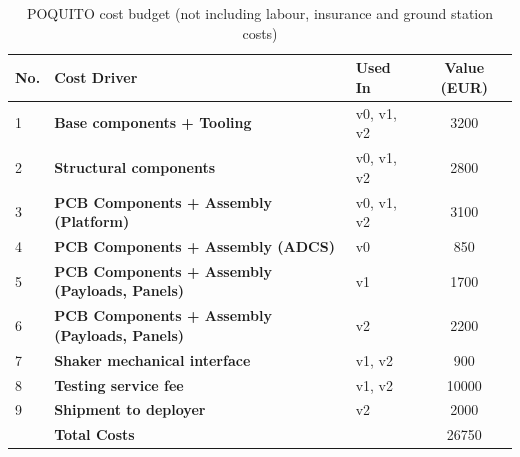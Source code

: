 \documentclass[a4paper,nobib,justified,final]{tufte-book}
\begin{document}
\begin{table}[h]
	\begin{tabularx}{\textwidth}{@{}lXlS@{}}
		\toprule
		No. & \textbf{Cost Driver}                     & Used In                                       & {Value (EUR)} \\ \midrule
		1   & \textbf{Base components + Tooling}                      & v0, v1, v2                  & 3200 \\ 


		2   & \textbf{Structural components}           & v0, v1, v2                       & 2800 \\
		3   & \textbf{PCB Components + Assembly (Platform)}       & v0, v1, v2  & 3100 \\ %
		4   & \textbf{PCB Components + Assembly (\acs{ADCS})}                & v0 & 850   \\ %

		5   & \textbf{PCB Components + Assembly (Payloads, Panels)}                & v1 & 1700   \\

		6   & \textbf{PCB Components + Assembly (Payloads, Panels)}                & v2 & 2200   \\

		7   & \textbf{Shaker mechanical interface}                & v1, v2 &  900  \\

		8   & \textbf{Testing service fee}           & v1, v2 & 10000 \\
		9   & \textbf{Shipment to deployer}           & v2 & 2000 \\
		\midrule
		& \textbf{Total Costs}                     &                                               & 26750 \\ \bottomrule
	\end{tabularx}
	\caption[POQUITO cost budget]{POQUITO cost budget (not including labour, insurance and ground station costs)}
	\label{tab:c_poquito_costs}
\end{table}
\end{document}

